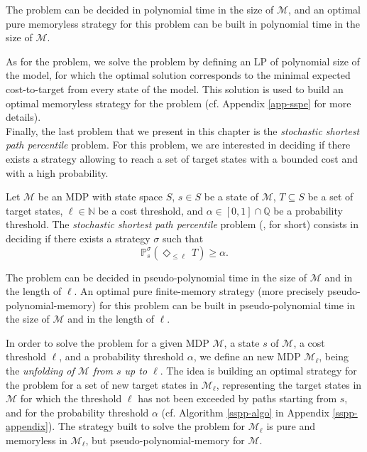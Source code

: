 \begin{theorem}
  The \SSPE{} problem can be decided in polynomial time in the size of $\mathcal{M}$, %
  and an optimal pure memoryless strategy for this problem can be built in polynomial time in the size of $\mathcal{M}$. %
\end{theorem}

As for the \SR{} problem, we solve the problem by defining an LP of polynomial size of the model, for which the optimal solution corresponds to the minimal expected cost-to-target from every state of the model.
This solution is used to build an optimal memoryless strategy for the problem (cf. Appendix \ref{app-sspe} for more details).\\

Finally, the last problem that we present in this chapter is the
\textit{stochastic shortest path percentile} problem. For this problem, we
are interested in deciding if there exists a strategy allowing to reach a set of target states with
a bounded cost and with a high probability.

\begin{definition}\label{sspp-def}
  Let $\mathcal{M}$ be an MDP with state space $S$, $s \in S$ be a state of
  $\mathcal{M}$, $T \subseteq S$ be a set of target states, $\ell \in \mathbb{N}$
  be a cost threshold, and $\alpha \in [0, 1] \cap \mathbb{Q}$ be a probability
  threshold. The \textit{stochastic shortest path percentile} problem (\SSPP{}, for short)
  consists in deciding if there exists a strategy $\sigma$ such that
  \[
    \mathbb{P}_s^\sigma (\Diamond_{\leq \ell}\, T) \geq \alpha.
  \]
\end{definition}

\begin{theorem}\label{sspp-thm}
  The \SSPP{} problem can be decided in pseudo-polynomial time in the size of $\mathcal{M}$ and in the length of $\ell$.
  An optimal pure finite-memory strategy (more precisely pseudo-polynomial-memory) for this problem can be built in pseudo-polynomial time in the size of $\mathcal{M}$ and in the length of $\ell$.
\end{theorem}

In order to solve the \SSPP{} problem for a given MDP $\mathcal{M}$, a state $s$ of $\mathcal{M}$, a cost threshold $\ell$, and a probability threshold $\alpha$, we define an new MDP $\mathcal{M}_\ell$, being the \textit{unfolding of $\mathcal{M}$ from $s$ up to $\ell$}.
The idea is building an optimal strategy for the \SR{} problem for a set of new target states in $\mathcal{M}_\ell$, representing the target states in $\mathcal{M}$ for which the threshold $\ell$ has not been exceeded by paths starting from $s$, and for the probability threshold $\alpha$ (cf. Algorithm \ref{sspp-algo} in Appendix \ref{sspp-appendix}).
The strategy built to solve the \SR{} problem for $\mathcal{M}_\ell$ is pure and memoryless in $\mathcal{M}_\ell$, but pseudo-polynomial-memory for $\mathcal{M}$.

